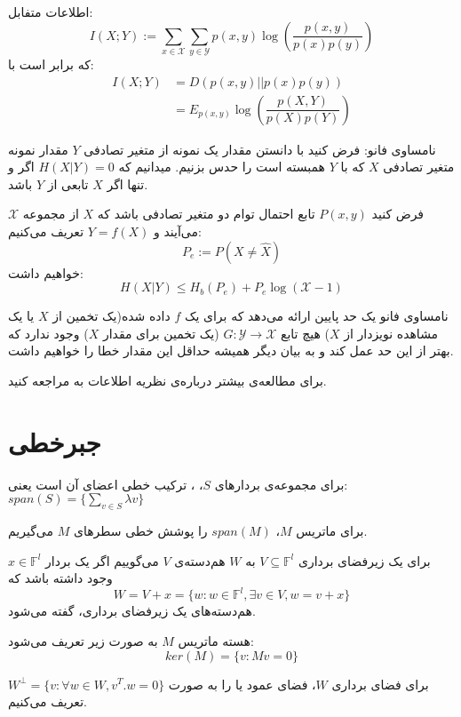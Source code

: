 \begin{definition}
اطلاعات متفابل:
$$I(X; Y) := \sum_{x \in \mathcal{X}} \sum_{y \in \mathcal{Y}} p(x, y) \log(\dfrac{p(x, y)}{p(x)p(y)})$$
که برابر است با:
\begin{align*}
    I(X;Y) &= D(p(x, y) || p(x)p(y))
    \\
    &= E_{p(x, y)} \log(\dfrac{p(X, Y)}{p(X)p(Y)})
\end{align*}
\end{definition}
نامساوی فانو: فرض کنید با دانستن مقدار یک نمونه از متغیر تصادفی
$Y$
مقدار نمونه متغیر تصادفی
$X$
که با
$Y$
همبسته است را حدس بزنیم. میدانیم که
$H(X|Y) = 0$
اگر و تنها اگر
$X$
تابعی از
$Y$
باشد. 
\begin{theorem}[فانو]
فرض کنید
$P(x, y)$
تابع احتمال توام دو متغیر تصادفی باشد که
$X$
از مجموعه
$\mathcal{X}$
می‌آیند و
$Y = f(X)$
تعریف می‌کنیم:
$$P_e := P(X \neq \hat{X})$$
خواهیم داشت:
$$H(X|Y) \leq H_b(P_e) + P_e \log(\mathcal{X} - 1)$$
\end{theorem}
\begin{remark}
نامساوی فانو یک حد پایین ارائه می‌دهد که برای یک
$f$
داده شده(یک تخمین از
$X$
یا یک مشاهده نویزدار از
$X$)
هیچ تابع
$G:\mathcal{Y} \rightarrow \mathcal{X}$
(یک تخمین برای مقدار
$X$)
وجود ندارد که بهتر از این حد عمل کند و به بیان دیگر همیشه حداقل این مقدار خطا را خواهیم داشت.
\end{remark}

	برای مطالعه‌ی بیشتر درباره‌ی نظریه اطلاعات به
\cite{book:info}
مراجعه کنید.
\section{جبرخطی}
\begin{definition}
	برای مجموعه‌ی بردار‌های
	$S$، ،
	ترکیب خطی اعضای آن است یعنی:
	$span(S) = \{ \sum\limits_{v \in S} \lambda v\}$
	
	برای ماتریس
	$M$، $span(M)$
را پوشش خطی سطرهای 
$M$
می‌گیریم.
\end{definition}

\begin{definition}[هم‌دسته]
	\label{coset}
	برای یک زیرفضای برداری
	$V \subseteq \mathbb{F}^l$
	به
	$W$
	هم‌دسته‌‌‌ی
	$V$
	می‌گوییم اگر یک بردار
	$x \in \mathbb{F}^l$
	وجود داشته باشد که
	$$W = V + x = \{w: w \in \mathbb{F}^l, \exists v \in V, w = v + x\}$$
	هم‌دسته‌های یک زیرفضای برداری،
	گفته می‌شود.
\end{definition}
\begin{definition}
	هسته ماتریس
	$M$
	به صورت زیر تعریف می‌شود:
	$$ker(M) = \{v: Mv = 0\}$$
\end{definition}
برای فضای برداری
$W$،
فضای عمود یا 
 را به صورت
$W^\bot = \{v: \forall w \in W, v^T.w = 0\}$
تعریف می‌کنیم.

